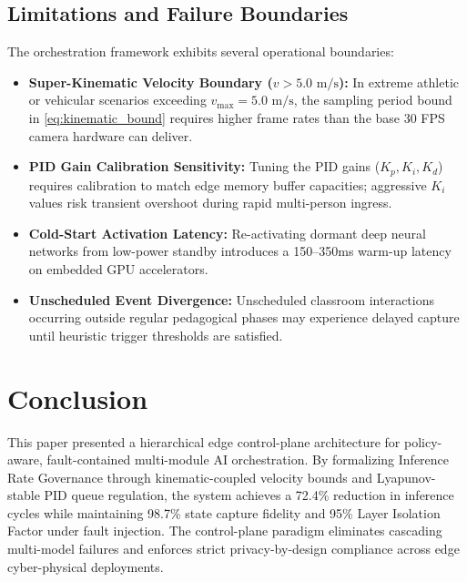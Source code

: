 \documentclass[conference]{IEEEtran}
\begin{document}
\subsection{Limitations and Failure Boundaries}
The orchestration framework exhibits several operational boundaries:
\begin{itemize}
    \item \textbf{Super-Kinematic Velocity Boundary ($v > 5.0\text{ m/s}$):} In extreme athletic or vehicular scenarios exceeding $v_{\max} = 5.0\text{ m/s}$, the sampling period bound in \eqref{eq:kinematic_bound} requires higher frame rates than the base 30 FPS camera hardware can deliver.
    \item \textbf{PID Gain Calibration Sensitivity:} Tuning the PID gains ($K_p, K_i, K_d$) requires calibration to match edge memory buffer capacities; aggressive $K_i$ values risk transient overshoot during rapid multi-person ingress.
    \item \textbf{Cold-Start Activation Latency:} Re-activating dormant deep neural networks from low-power standby introduces a 150--350ms warm-up latency on embedded GPU accelerators.
    \item \textbf{Unscheduled Event Divergence:} Unscheduled classroom interactions occurring outside regular pedagogical phases may experience delayed capture until heuristic trigger thresholds are satisfied.
\end{itemize}

\section{Conclusion}

This paper presented a hierarchical edge control-plane architecture for policy-aware, fault-contained multi-module AI orchestration. By formalizing Inference Rate Governance through kinematic-coupled velocity bounds and Lyapunov-stable PID queue regulation, the system achieves a 72.4\% reduction in inference cycles while maintaining 98.7\% state capture fidelity and 95\% Layer Isolation Factor under fault injection. The control-plane paradigm eliminates cascading multi-model failures and enforces strict privacy-by-design compliance across edge cyber-physical deployments.
\end{document}
